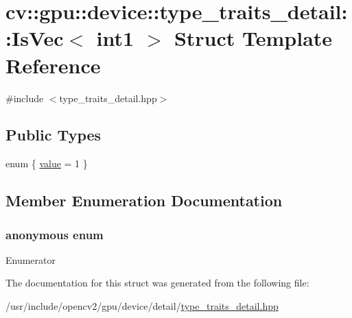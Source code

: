 \hypertarget{structcv_1_1gpu_1_1device_1_1type__traits__detail_1_1IsVec_3_01int1_01_4}{\section{cv\-:\-:gpu\-:\-:device\-:\-:type\-\_\-traits\-\_\-detail\-:\-:Is\-Vec$<$ int1 $>$ Struct Template Reference}
\label{structcv_1_1gpu_1_1device_1_1type__traits__detail_1_1IsVec_3_01int1_01_4}
}


{\ttfamily \#include $<$type\-\_\-traits\-\_\-detail.\-hpp$>$}

\subsection*{Public Types}
\begin{DoxyCompactItemize}
\item 
enum \{ \hyperlink{structcv_1_1gpu_1_1device_1_1type__traits__detail_1_1IsVec_3_01int1_01_4_af8914017f8f70dd18e57dada3c34d724a03d8173ea936c0129df04fc24f78aebf}{value} = 1
 \}
\end{DoxyCompactItemize}


\subsection{Member Enumeration Documentation}
\hypertarget{structcv_1_1gpu_1_1device_1_1type__traits__detail_1_1IsVec_3_01int1_01_4_af8914017f8f70dd18e57dada3c34d724}{\subsubsection[{anonymous enum}]{\setlength{\rightskip}{0pt plus 5cm}anonymous enum}}\label{structcv_1_1gpu_1_1device_1_1type__traits__detail_1_1IsVec_3_01int1_01_4_af8914017f8f70dd18e57dada3c34d724}
\begin{Desc}
\item[Enumerator]\par
\begin{description}
\item[{\em 
\hypertarget{structcv_1_1gpu_1_1device_1_1type__traits__detail_1_1IsVec_3_01int1_01_4_af8914017f8f70dd18e57dada3c34d724a03d8173ea936c0129df04fc24f78aebf}{value}\label{structcv_1_1gpu_1_1device_1_1type__traits__detail_1_1IsVec_3_01int1_01_4_af8914017f8f70dd18e57dada3c34d724a03d8173ea936c0129df04fc24f78aebf}
}]\end{description}
\end{Desc}


The documentation for this struct was generated from the following file\-:\begin{DoxyCompactItemize}
\item 
/usr/include/opencv2/gpu/device/detail/\hyperlink{type__traits__detail_8hpp}{type\-\_\-traits\-\_\-detail.\-hpp}\end{DoxyCompactItemize}
